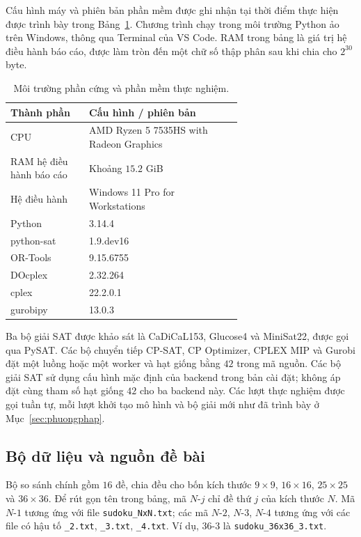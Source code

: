 \documentclass[a4paper,fleqn]{cas-sc}
\begin{document}
Cấu hình máy và phiên bản phần mềm được ghi nhận tại thời điểm thực
hiện được trình bày trong Bảng~\ref{tab:exp-environment}. Chương trình
chạy trong môi trường Python ảo trên Windows, thông qua Terminal của
VS Code. RAM trong bảng là giá trị hệ điều hành báo cáo, được làm tròn
đến một chữ số thập phân sau khi chia cho $2^{30}$ byte.

\begin{table}[pos=htbp]
 \centering
 \caption{Môi trường phần cứng và phần mềm thực nghiệm.}
 \label{tab:exp-environment}
 \begin{tabular}{lp{0.66\linewidth}}
  \toprule
  Thành phần & Cấu hình / phiên bản \\
  \midrule
  CPU & AMD Ryzen 5 7535HS with Radeon Graphics \\
  RAM hệ điều hành báo cáo & Khoảng $15.2$ GiB \\
  Hệ điều hành & Windows 11 Pro for Workstations \\
  Python & 3.14.4 \\
  python-sat & 1.9.dev16 \\
  OR-Tools & 9.15.6755 \\
  DOcplex & 2.32.264 \\
  cplex & 22.2.0.1 \\
  gurobipy & 13.0.3 \\
  \bottomrule
 \end{tabular}
\end{table}

Ba bộ giải SAT được khảo sát là CaDiCaL153, Glucose4 và MiniSat22,
được gọi qua PySAT. Các bộ chuyển tiếp CP-SAT, CP Optimizer, CPLEX MIP
và Gurobi đặt một luồng hoặc một worker và hạt giống bằng $42$ trong
mã nguồn. Các bộ giải SAT sử dụng cấu hình mặc định của backend trong
bản cài đặt; không áp đặt cùng tham số hạt giống $42$ cho ba backend này.
Các lượt thực nghiệm được gọi tuần tự, mỗi lượt khởi tạo mô hình và bộ
giải mới như đã trình bày ở Mục~\ref{sec:phuongphap}.

\subsection{Bộ dữ liệu và nguồn đề bài}

Bộ so sánh chính gồm $16$ đề, chia đều cho bốn kích thước
$9\times9$, $16\times16$, $25\times25$ và $36\times36$.
Để rút gọn tên trong bảng, mã $N$-$j$ chỉ đề thứ $j$ của kích thước $N$.
Mã $N$-$1$ tương ứng với file \texttt{sudoku\_NxN.txt}; các mã
$N$-$2$, $N$-$3$, $N$-$4$ tương ứng với các file có hậu tố
\texttt{\_2.txt}, \texttt{\_3.txt}, \texttt{\_4.txt}.
Ví dụ, $36$-$3$ là \texttt{sudoku\_36x36\_3.txt}.
\end{document}
